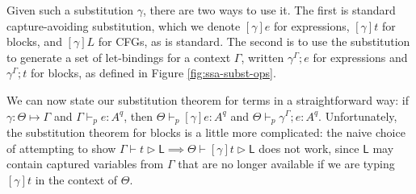 \documentclass[acmsmall,screen,review]{acmart}
\newcommand{\ms}[1]{\ensuremath{\mathsf{#1}}}
\newcommand{\hasty}[5]{#1 \vdash_{#2} #3: {#4}^{#5}}
\newcommand{\haslb}[3]{#1 \vdash #2 \rhd #3}
\newcommand{\issubst}[3]{#1: #2 \mapsto #3}
\newcommand{\exprletsubst}[2]{{#1};{#2}}
\newcommand{\stmtletsubst}[2]{{#1};{#2}}
\newcommand{\substctx}[2]{{#1}^{#2}}
\begin{document}
Given such a substitution \(\gamma\), there are two ways to use it. The first is
standard capture-avoiding substitution, which we denote \([\gamma]e\) for
expressions, \([\gamma]t\) for blocks, and \([\gamma]L\) for CFGs, as is
standard. The second is to use the substitution to generate a set of
let-bindings for a context \(\Gamma\), written
\(\exprletsubst{\substctx{\gamma}{\Gamma}}{e}\) for expressions and
\(\stmtletsubst{\substctx{\gamma}{\Gamma}}{t}\) for blocks, as defined in Figure
\ref{fig:ssa-subst-ops}. 
%
%

We can now state our substitution theorem for terms in a straightforward way: if
\(\issubst{\gamma}{\Theta}{\Gamma}\) and \(\hasty{\Gamma}{p}{e}{A}{q}\), then
\(\hasty{\Theta}{p}{[\gamma]e}{A}{q}\) and
\(\hasty{\Theta}{p}{\exprletsubst{\substctx{\gamma}{\Gamma}}{e}}{A}{q}\).
Unfortunately, the substitution theorem for blocks is a little more complicated:
the naive choice of attempting to show \(\haslb{\Gamma}{t}{\ms{L}} \implies
\haslb{\Theta}{[\gamma]t}{\ms{L}}\) does not work, since \(\ms{L}\) may contain
captured variables from \(\Gamma\) that are no longer available if we are typing
\([\gamma]t\) in the context of \(\Theta\). 
\end{document}
